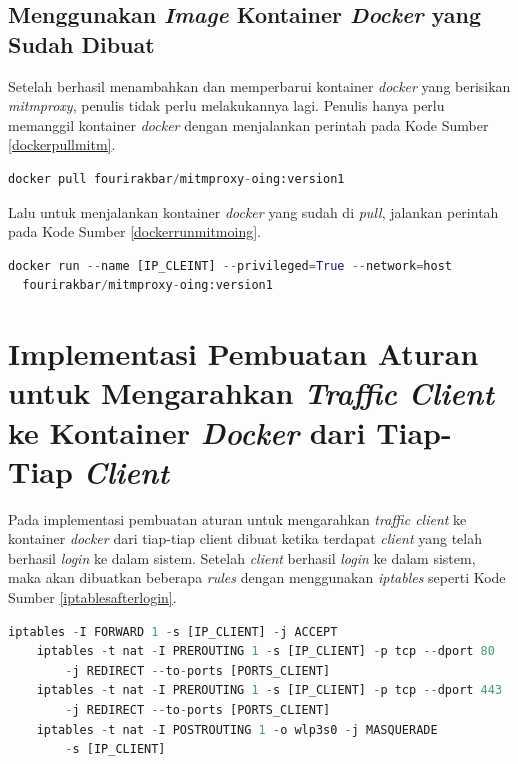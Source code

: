   \subsection{Menggunakan \textit{Image} Kontainer \textit{Docker} yang Sudah Dibuat}
  Setelah berhasil menambahkan dan memperbarui kontainer \textit{docker} yang berisikan \textit{mitmproxy}, penulis tidak perlu melakukannya lagi. Penulis hanya perlu memanggil kontainer \textit{docker} dengan menjalankan perintah pada Kode Sumber \ref{dockerpullmitm}.
  \newline
  \begin{minipage}{\linewidth}
  \begin{lstlisting}[caption=Perintah untuk \textit{Pull Image mitmproxy},language=Python,label=dockerpullmitm]
  docker pull fourirakbar/mitmproxy-oing:version1
  \end{lstlisting}
  \end{minipage}
  Lalu untuk menjalankan kontainer \textit{docker} yang sudah di \textit{pull}, jalankan perintah pada Kode Sumber \ref{dockerrunmitmoing}.
  \newline
  \begin{minipage}{\linewidth}
  \begin{lstlisting}[caption=Perintah untuk \textit{Pull Image mitmproxy},language=Python,label=dockerrunmitmoing]
  docker run --name [IP_CLEINT] --privileged=True --network=host 
  fourirakbar/mitmproxy-oing:version1
  \end{lstlisting}
  \end{minipage}
  
\section{Implementasi Pembuatan Aturan untuk Mengarahkan \textit{Traffic Client} ke Kontainer \textit{Docker} dari Tiap-Tiap \textit{Client}}
Pada implementasi pembuatan aturan untuk mengarahkan \textit{traffic client} ke kontainer \textit{docker} dari tiap-tiap client dibuat ketika terdapat \textit{client} yang telah berhasil \textit{login} ke dalam sistem. Setelah \textit{client} berhasil \textit{login} ke dalam sistem, maka akan dibuatkan beberapa \textit{rules} dengan menggunakan \textit{iptables} seperti Kode Sumber \ref{iptablesafterlogin}. \\
\begin{minipage}{\linewidth}
	\begin{lstlisting}[caption=Command untuk mengarahkan \textit{client} ke halaman \textit{login},language=Python,label=iptablesafterlogin]
	iptables -I FORWARD 1 -s [IP_CLIENT] -j ACCEPT
	iptables -t nat -I PREROUTING 1 -s [IP_CLIENT] -p tcp --dport 80
		-j REDIRECT --to-ports [PORTS_CLIENT]
	iptables -t nat -I PREROUTING 1 -s [IP_CLIENT] -p tcp --dport 443
		-j REDIRECT --to-ports [PORTS_CLIENT]
	iptables -t nat -I POSTROUTING 1 -o wlp3s0 -j MASQUERADE 
		-s [IP_CLIENT]
\end{lstlisting}
\end{minipage}

